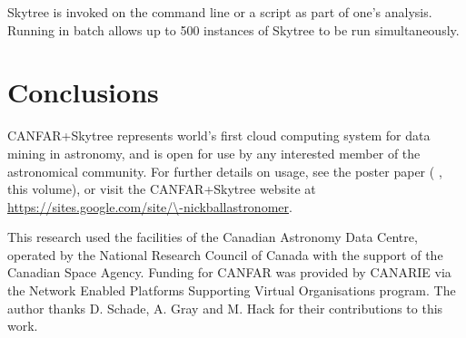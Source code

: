 Skytree is invoked on the command line or a script as part of one's analysis. Running in batch allows up to 500 instances of Skytree to be run simultaneously.

\section{Conclusions}

CANFAR+Skytree represents world's first cloud computing system for data mining in astronomy, and is open for use by any interested member of the astronomical community. For further details on usage, see the poster paper (\citeauthor{ball:adass12poster} \citeyear{ball:adass12poster}, this volume), or visit the CANFAR+Skytree website at \url{https://sites.google.com/site/\-nickballastronomer}.

\acknowledgements This research used the facilities of the Canadian Astronomy Data Centre, operated by the National Research Council of Canada with the support of the Canadian Space Agency. Funding for CANFAR was provided by CANARIE via the Network Enabled Platforms Supporting Virtual Organisations program. The author thanks D. Schade, A. Gray and M. Hack for their contributions to this work.


